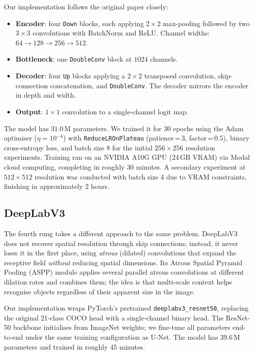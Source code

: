 \documentclass[conference]{IEEEtran}
\begin{document}
Our implementation follows the original paper closely:
\begin{itemize}
  \item \textbf{Encoder}: four \texttt{Down} blocks, each applying $2\times2$ max-pooling
        followed by two $3\times3$ convolutions with BatchNorm and ReLU.
        Channel widths: $64 \to 128 \to 256 \to 512$.
  \item \textbf{Bottleneck}: one \texttt{DoubleConv} block at $1024$ channels.
  \item \textbf{Decoder}: four \texttt{Up} blocks applying a $2\times2$ transposed
        convolution, skip-connection concatenation, and \texttt{DoubleConv}.
        The decoder mirrors the encoder in depth and width.
  \item \textbf{Output}: $1\times1$ convolution to a single-channel logit map.
\end{itemize}
The model has 31.0\,M parameters.
We trained it for 30 epochs using the Adam optimiser ($\eta = 10^{-4}$) with
\texttt{ReduceLROnPlateau} (patience\,=\,3, factor\,=\,0.5), binary cross-entropy loss,
and batch size 8 for the initial $256\times256$ resolution experiments.
Training ran on an NVIDIA A10G GPU (24\,GB VRAM) via Modal cloud computing,
completing in roughly 30 minutes. A secondary experiment at $512\times512$ resolution was conducted with batch size 4 due to VRAM constraints, finishing in approximately 2 hours.

\subsection{DeepLabV3}
\label{sec:deeplabv3}

The fourth rung takes a different approach to the same problem.
DeepLabV3 \cite{chen2017deeplabv3} does not recover spatial resolution through skip
connections; instead, it never loses it in the first place, using \textit{atrous} (dilated)
convolutions that expand the receptive field \textit{without} reducing spatial dimensions.
Its Atrous Spatial Pyramid Pooling (ASPP) module applies several parallel atrous convolutions
at different dilation rates and combines them; the idea is that multi-scale context helps
recognise objects regardless of their apparent size in the image.

Our implementation wraps PyTorch's pretrained \texttt{deeplabv3\_resnet50}, replacing the
original 21-class COCO head with a single-channel binary head.
The ResNet-50 backbone initialises from ImageNet weights; we fine-tune all parameters
end-to-end under the same training configuration as U-Net.
The model has 39.6\,M parameters and trained in roughly 45 minutes.
\end{document}
